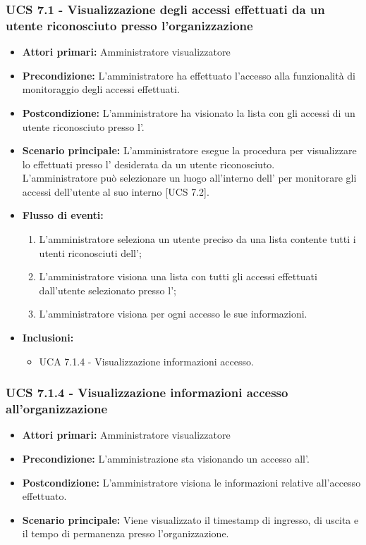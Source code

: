 \subsubsection{UCS 7.1 - Visualizzazione degli accessi effettuati da un utente riconosciuto presso l'organizzazione}
\begin{itemize}
	\item \textbf{Attori primari:} Amministratore visualizzatore
	\item \textbf{Precondizione:} L'amministratore ha effettuato l'accesso alla funzionalità di monitoraggio degli accessi effettuati.
	\item \textbf{Postcondizione:} L'amministratore ha visionato la lista con gli accessi di un utente riconosciuto presso l'.
	\item \textbf{Scenario principale:} L'amministratore esegue la procedura per visualizzare lo  effettuati presso l' desiderata da un utente riconosciuto.\\
	L'amministratore può selezionare un luogo all'interno dell' per monitorare gli accessi dell'utente al suo interno [UCS 7.2].
	\item \textbf{Flusso di eventi:}
	\begin{enumerate}
	\item L'amministratore seleziona un utente preciso da una lista contente tutti i utenti riconosciuti dell';
	\item L'amministratore visiona una lista con tutti gli accessi effettuati dall'utente selezionato presso l';
	\item L'amministratore visiona per ogni accesso le sue informazioni.
	\end{enumerate}
	\item \textbf{Inclusioni:}
    \begin{itemize}
        \item UCA 7.1.4 - Visualizzazione informazioni accesso.
    \end{itemize}
\end{itemize}

\subsubsection{UCS 7.1.4 - Visualizzazione informazioni accesso all'organizzazione}
\begin{itemize}
	\item \textbf{Attori primari:} Amministratore visualizzatore
	\item \textbf{Precondizione:} L'amministrazione sta visionando un accesso all'.
	\item \textbf{Postcondizione:} L'amministratore visiona le informazioni relative all'accesso effettuato.
	\item \textbf{Scenario principale:} Viene visualizzato il timestamp di ingresso, di uscita e il tempo di permanenza presso l'organizzazione.
\end{itemize}

